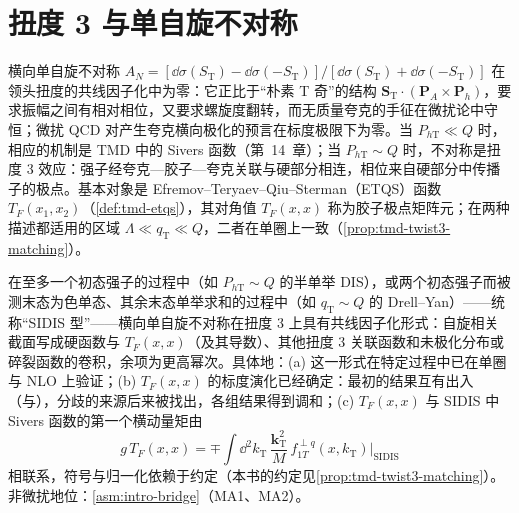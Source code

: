 \section{扭度 3 与单自旋不对称}\label{sec:power-twist3}

横向单自旋不对称 $A_N=[\dd\sigma(S_{\mathrm T})-\dd\sigma(-S_{\mathrm T})]/[\dd\sigma(S_{\mathrm T})+\dd\sigma(-S_{\mathrm T})]$ 在领头扭度的共线因子化中为零：它正比于“朴素 T 奇”的结构 $\mathbf S_{\mathrm T}\cdot(\mathbf P_A\times\mathbf P_h)$，要求振幅之间有相对相位，又要求螺旋度翻转，而无质量夸克的手征在微扰论中守恒；微扰 QCD 对产生夸克横向极化的预言在标度极限下为零\cite{Kane:1978nd}。当 $P_{h\mathrm T}\ll Q$ 时，相应的机制是 TMD 中的 Sivers 函数（第~14~章）；当 $P_{h\mathrm T}\sim Q$ 时，不对称是扭度 3 效应：强子经夸克—胶子—夸克关联与硬部分相连，相位来自硬部分中传播子的极点。基本对象是 Efremov--Teryaev--Qiu--Sterman（ETQS）函数 $T_F(x_1,x_2)$（\cref{def:tmd-etqs}）\cite{Efremov:1981sh,EfremovTeryaev1985,QiuSterman1991c}，其对角值 $T_F(x,x)$ 称为胶子极点矩阵元；在两种描述都适用的区域 $\Lambda\ll q_{\mathrm T}\ll Q$，二者在单圈上一致\cite{Ji:2006ub}（\cref{prop:tmd-twist3-matching}）。

\begin{proposition}\label{prop:power-twist3-sidis}
在至多一个初态强子的过程中（如 $P_{h\mathrm T}\sim Q$ 的半单举 DIS），或两个初态强子而被测末态为色单态、其余末态单举求和的过程中（如 $q_{\mathrm T}\sim Q$ 的 Drell--Yan）——统称“SIDIS 型”——横向单自旋不对称在扭度 3 上具有共线因子化形式：自旋相关截面写成硬函数与 $T_F(x,x)$（及其导数）、其他扭度 3 关联函数和未极化分布或碎裂函数的卷积，余项为更高幂次。具体地：(a) 这一形式在特定过程中已在单圈与 NLO 上验证\cite{Ji:2006ub,Vogelsang:2009pj}；(b) $T_F(x,x)$ 的标度演化已经确定：最初的结果互有出入（\cite{Braun:2009mi}与\cite{Kang:2008ey}），分歧的来源后来被找出，各组结果得到调和\cite{Kang:2012em,Schafer:2012ra}；(c) $T_F(x,x)$ 与 SIDIS 中 Sivers 函数的第一个横动量矩由
\begin{equation}\label{eq:power-TF-sivers}
g\,T_F(x,x)=\mp\int\!\dd^2k_{\mathrm T}\,\frac{\mathbf k_{\mathrm T}^2}{M}\,f^{\perp q}_{1T}(x,k_{\mathrm T})\Big|_{\mathrm{SIDIS}}
\end{equation}
相联系，符号与归一化依赖于约定\cite{Boer:2003cm}（本书的约定见\cref{prop:tmd-twist3-matching}）。
非微扰地位：\cref{asm:intro-bridge}（MA1、MA2）。
\end{proposition}

